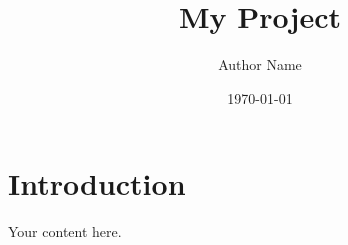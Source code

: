 \documentclass{article}
\title{My Project}
\author{Author Name}
\date{\today}
\begin{document}
\maketitle

\section{Introduction}

Your content here.
\end{document}
